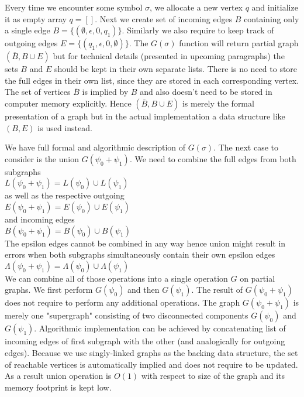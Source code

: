 Every time we encounter some symbol $\sigma$, we allocate a new vertex $q$ and initialize it as empty array $q=[]$. Next we create set of incoming edges $B$ containing only a single edge $B=\{(\emptyset,\epsilon,0,q_1)\}$. Similarly we also require to keep track of outgoing edges $E=\{(q_1,\epsilon,0,\emptyset)\}$. The $G(\sigma)$ function will return partial graph $(\overline{B},B \cup E)$ but for technical details (presented in upcoming paragraphs) the sets $B$ and $E$ should be kept in their own separate lists. There is  no need to store the full edges in their own list, since they are stored in each corresponding vertex. The set of vertices $\overline{B}$ is implied by $B$ and also doesn't need to be stored in computer memory explicitly. Hence $(\overline{B},B \cup E)$  is merely the formal presentation of a graph but in the actual implementation a data structure like $(B,E)$ is used instead. 

We have full formal and algorithmic description of $G(\sigma)$. The next case to consider is the union $G(\psi_0 + \psi_1)$. We need to
combine the full edges from both subgraphs \\
$L(\psi_0 + \psi_1) = L(\psi_0)\cup L(\psi_1) $ \\
as well as the respective outgoing \\
$E(\psi_0 + \psi_1) = E(\psi_0)\cup E(\psi_1) $ \\
and incoming edges \\
$B(\psi_0 + \psi_1) = B(\psi_0)\cup B(\psi_1) $ \\
The epsilon edges cannot be combined in any way hence union might result in errors when both subgraphs simultaneously contain their own epsilon edges \\
$\Lambda(\psi_0+\psi_1) = \Lambda(\psi_0) \cup \Lambda(\psi_1)$ \\
We can combine all of those operations into a single operation $G$ on partial graphs. We first perform $G(\psi_0)$ and then $G(\psi_1)$. The result of $G(\psi_0 + \psi_1)$ does not require to perform any additional operations. The graph $G(\psi_0 + \psi_1)$ is merely one "supergraph" consisting of two disconnected components $G(\psi_0)$ and $G(\psi_1)$. Algorithmic implementation can be achieved by concatenating list of incoming edges of first subgraph with the other (and analogically for outgoing edges). Because we use singly-linked graphs as the backing data structure, the set of reachable vertices is automatically implied and does not require to be updated.
As a result union operation is $O(1)$ with respect to size of the graph and its memory footprint is kept low. 


